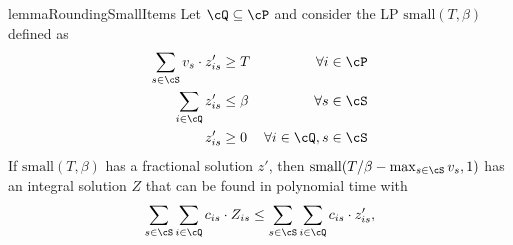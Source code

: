 \begin{restatable}{lemma}{RoundingSmallItems}
    \label{lem:rounding-small-items}
    Let $\cQ \subseteq \cP$ and consider the LP $\mathrm{small}(T, \beta)$ defined as
    \begin{align*}
        \sum_{s\in \cS} v_s \cdot z'_{is} &\ge T &\forall i\in\cP \\
        \sum_{i\in \cQ} z'_{is} &\le \beta &\forall s\in\cS\\
        z'_{is} &\ge 0 &\forall i\in \cQ, s\in \cS
    \end{align*}
    If $\mathrm{small}(T, \beta)$ has a fractional solution $z'$,
    then $\mathrm{small}(T/\beta - \max_{s\in\cS} v_s, 1)$ has an integral solution $Z$ that can be found in polynomial time with
    \begin{equation*}
       \sum_{s\in\cS}\sum_{i\in\cQ} c_{is}\cdot Z_{is}     
       \le \sum_{s\in\cS}\sum_{i\in\cQ} c_{is}\cdot z'_{is},
    \end{equation*}
\end{restatable}
